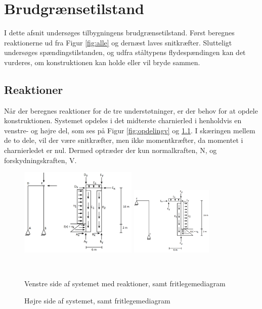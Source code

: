 \chapter{Brudgrænsetilstand}

I dette afsnit undersøges tilbygningens brudgrænsetilstand. Først beregnes reaktionerne ud fra Figur \ref{fig:alle} og dernæst laves snitkræfter. Slutteligt undersøges spændingstilstanden, og udfra ståltypens flydespændingen kan det vurderes, om konstruktionen kan holde eller vil bryde sammen.   

\section{Reaktioner}
Når der beregnes reaktioner for de tre understøtninger, er der behov for at opdele konstruktionen. Systemet opdeles i det midterste charnierled i henholdvis en venstre- og højre del, som ses på Figur \ref{fig:opdelingv} og \ref{fig:opdelingh}. I skæringen mellem de to dele, vil der være snitkræfter, men ikke momentkræfter, da momentet i charnierledet er nul. Dermed optræder der kun normalkraften, N, og forskydningskraften, V.

\begin{figure}[htbp]\centering
	\begin{minipage}[b]{0.48\textwidth}\centering
		\includegraphics[width=0.50\textwidth]{billeder/venstre.png} %
	\end{minipage}\hfill
	\begin{minipage}[b]{0.48\textwidth}\centering
		\includegraphics[width=0.35\textwidth]{billeder/hojre.png} %
	\end{minipage}\\ %
	\begin{minipage}[t]{0.6\textwidth}
		\caption{Venstre side af systemet med reaktioner, samt fritlegemediagram} %
		\label{fig:opdelingv}
	\end{minipage}\hfill
	\begin{minipage}[t]{0.6\textwidth}
		\caption{Højre side af systemet, samt fritlegemediagram} %
		\label{fig:opdelingh}
	\end{minipage}
\end{figure}


